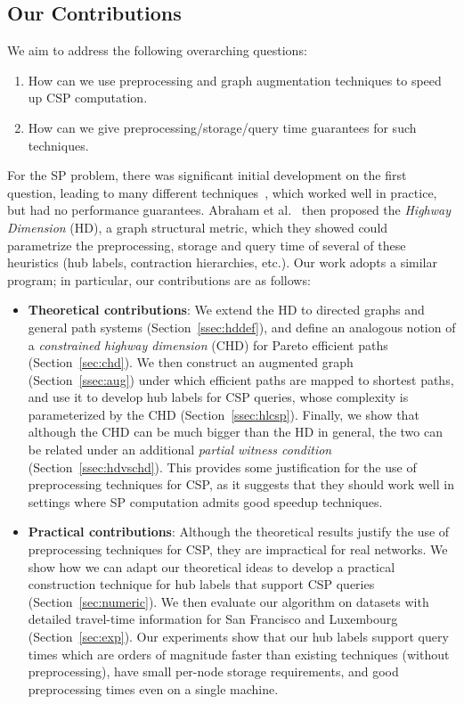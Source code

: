 \subsection{Our Contributions}

\noindent We aim to address the following overarching questions:
\begin{enumerate}[nosep,leftmargin=*]
\item How can we use preprocessing and graph augmentation techniques to speed up CSP computation. 
\item How can we give preprocessing/storage/query time guarantees for such techniques.
\end{enumerate}

For the SP problem, there was significant initial development on the first question, leading to many different techniques~\cite{dimacs09}, which worked well in practice, but had no performance guarantees.
Abraham et al.~\cite{highway2013, highway2010} then proposed the \emph{Highway Dimension} (HD), a graph structural metric, which they showed could parametrize the preprocessing, storage and query time of several of these heuristics (hub labels, contraction hierarchies, etc.).
Our work adopts a similar program; in particular, our contributions are as follows:
\begin{itemize}[nosep,leftmargin=*]
\item \textbf{Theoretical contributions}: 
We extend the HD to directed graphs and general path systems (Section~\ref{ssec:hddef}), and define an analogous notion of a \emph{constrained highway dimension} (CHD) for Pareto efficient paths (Section~\ref{sec:chd}). We then construct an augmented graph (Section~\ref{ssec:aug}) under which efficient paths are mapped to shortest paths, and use it to develop hub labels for CSP queries, whose complexity is parameterized by the CHD (Section~\ref{ssec:hlcsp}).
Finally, we show that although the CHD can be much bigger than the HD in general, the two can be related under an additional \emph{partial witness condition} (Section~\ref{ssec:hdvschd}). This provides some justification for the use of preprocessing techniques for CSP, as it suggests that they should work well in settings where SP computation admits good speedup techniques.
\item \textbf{Practical contributions}: Although the theoretical results justify the use of preprocessing techniques for CSP, they are impractical for real networks. We show how we can adapt our theoretical ideas to develop a practical construction technique for hub labels that support CSP queries (Section~\ref{sec:numeric}). We then evaluate our algorithm on datasets with detailed travel-time information for San Francisco and Luxembourg (Section~\ref{sec:exp}). Our experiments show that our hub labels support query times which are orders of magnitude faster than existing techniques (without preprocessing), have small per-node storage requirements, and good preprocessing times even on a single machine. 
\end{itemize}	

